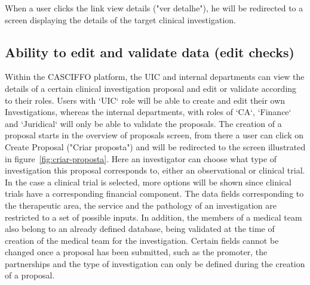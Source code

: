 When a user clicks the link view details ("ver detalhe"), he will be redirected to a screen displaying the details of the target clinical investigation.

\subsection{Ability to edit and validate data (edit checks)}
\label{subsec:abilitiy-to-edit}
Within the CASCIFFO platform, the UIC and internal departments can view the details of a certain clinical investigation proposal and edit or validate according to their roles.
Users with `UIC` role will be able to create and edit their own Investigations, whereas the internal departments, with roles of `CA`, `Finance` and `Juridical` will only be able to validate the proposals.  
The creation of a proposal starts in the overview of proposals screen, from there a user can click on Create Proposal ("Criar proposta") and will be redirected to the screen illustrated in figure~\ref{fig:criar-proposta}. Here an investigator can choose what type of investigation this proposal corresponds to, either an observational or clinical trial. In the case a clinical trial is selected, more options will be shown since clinical trials have a corresponding financial component.
The data fields corresponding to the therapeutic area, the service and the pathology of an investigation are restricted to a set of possible inputs. In addition, the members of a medical team also belong to an already defined database, being validated at the time of creation of the medical team for the investigation.  
Certain fields cannot be changed once a proposal has been submitted, such as the promoter, the partnerships and the type of investigation can only be defined during the creation of a proposal.  


